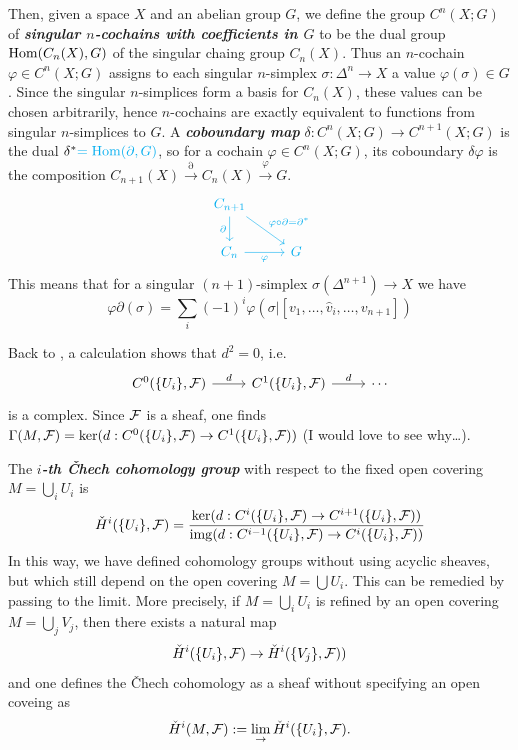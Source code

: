 \begin{remark}
	Then, given a space $X$ and an abelian group $G$, we define the group $C^n(X;G)$ of \textbf{\textit{singular $n$-cochains with coefficients in $G$}} to be the dual group $\operatorname{Hom}(C_n(X),G)$ of the singular chaing group $C_n(X)$. Thus an $n$-cochain $\varphi\in C^n(X;G)$ assigns to each singular $n$-simplex $\sigma:\Delta^n\to X$ a value $\varphi(\sigma)\in G$. Since the singular $n$-simplices form a basis for $C_n(X)$, these values can be chosen arbitrarily, hence $n$-cochains are exactly equivalent to functions from singular $n$-simplices to $G$. A \textbf{\textit{coboundary map}} $\delta:C^n(X;G)\to C^{n+1}(X;G)$ is the dual $\delta^*{\color{cyan}=\operatorname{Hom}(\partial,G)}$, so for a cochain $\varphi\in C^n(X;G)$, its coboundary $\delta\varphi$ is the composition $C_{n+1}(X)\overset{\partial}{\to}C_n(X)\overset{\varphi}{\to}G$.
		\[\begin{tikzcd}
		\textcolor{cyan}{C_{n+1}}\arrow[d,cyan,swap,"\partial"]\arrow[rd,cyan,"\varphi\circ\partial=\partial^*"]\\	\textcolor{cyan}{C_n}\arrow[cyan,swap,r,"\varphi"]&\textcolor{cyan}{G}
	\end{tikzcd}\]
	This means that for a singular $(n+1)$-simplex $\sigma(\Delta^{n+1})\to X$ we have
	\[\varphi\partial (\sigma)=\sum_i(-1)^i\varphi(\sigma|[v_1,\ldots,\widehat{v}_i,\ldots,v_{n+1}])\]
\end{remark}

Back to \cite{huybrechts}, a calculation shows that $d^2=0$, i.e.
\[\begin{tikzcd}
	C^0(\{U_i\},\Fc)\arrow[r,"d"]&C^1(\{U_i\},\Fc)\arrow[r,"d"]&\cdots
\end{tikzcd}\]
is a complex. {\color{magenta}Since $\mathcal{F}$ is a sheaf, one finds $\Gamma(M,\mathcal{F})=\ker(d:C^0(\{U_i\},\mathcal{F})\to C^1(\{U_i\},\mathcal{F}))$ (I would love to see why…)}.

\begin{defn}
	The \textbf{\textit{$i$-th \v Chech cohomology group}} with respect to the fixed open covering $M=\bigcup_iU_i$ is
	\[\check{H}^i(\{U_i\},\mathcal{F})=\dfrac{\ker(d:C^i(\{U_i\},\mathcal{F})\to C^{i+1}(\{U_i\},\mathcal{F}))}{\operatorname{img}(d:C^{i-1}(\{U_i\},\mathcal{F})\to C^i(\{U_i\},\mathcal{F}))}\]
	In this way, we have defined cohomology groups without using acyclic sheaves, but which still depend on the open covering $M=\bigcup U_i$. This can be remedied by passing to the limit. More precisely, if $M=\bigcup_i U_i$ is refined by an open covering $M=\bigcup_jV_j$, then there exists a natural map
	\[\check{H}^i(\{U_i\},\mathcal{F})\to\check{H}^i(\{V_j\},\mathcal{F}))\]
	and one defines the \v Chech cohomology as a sheaf without specifying an open coveing as
	\[\check{H}^i(M,\mathcal{F}):=\lim_\to \check{H}^i(\{U_i\},\mathcal{F}).\]
\end{defn}

